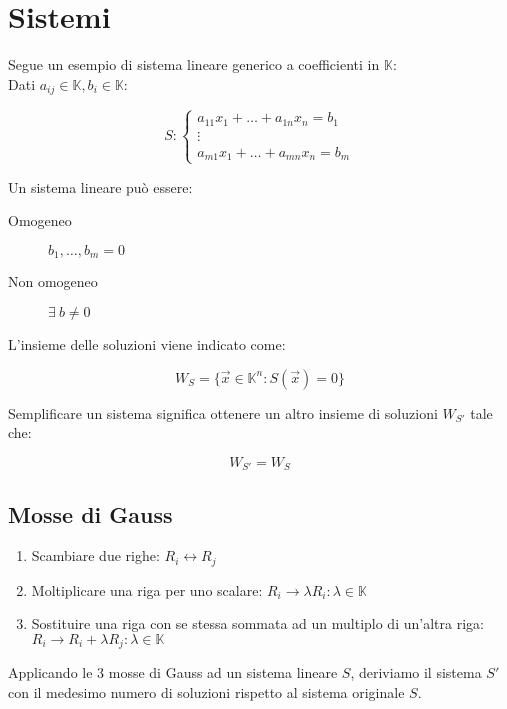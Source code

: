\documentclass{article}
\begin{document}
\section{Sistemi}

Segue un esempio di sistema lineare generico a coefficienti in $\mathbb{K}$:\\

\noindent
Dati $a_{ij} \in \mathbb{K}, b_i \in \mathbb{K}$:

$$
S: \begin{cases}
a_{11} x_1 + \dots + a_{1n} x_n = b_1\\
\vdots\\
a_{m1} x_1 + \dots + a_{mn} x_n = b_m
\end {cases}
$$

\noindent
Un sistema lineare può essere:

\begin{description}
    \item[Omogeneo] $b_1, \dots, b_m = 0$
    \item[Non omogeneo] $\exists \ b \neq 0$
\end{description}

\noindent
L'insieme delle soluzioni viene indicato come:

$$
W_S = \{ \vec{x} \in \mathbb{K}^n : S(\vec{x}) = 0 \}
$$

\noindent
Semplificare un sistema significa ottenere un altro insieme di soluzioni $W_{S'}$ tale che:

$$
W_{S'} = W_S
$$

\subsection{Mosse di Gauss}

\begin{enumerate}
    \item Scambiare due righe: $R_i \leftrightarrow R_j$
    \item Moltiplicare una riga per uno scalare: $R_i \to \lambda R_i : \lambda \in \mathbb{K}$
    \item Sostituire una riga con se stessa sommata ad un multiplo di un'altra riga: $R_i \to R_i + \lambda R_j : \lambda \in \mathbb{K}$
\end{enumerate}

Applicando le 3 mosse di Gauss ad un sistema lineare $S$, deriviamo il sistema $S'$ con il medesimo numero di soluzioni rispetto al sistema originale $S$.
\end{document}
